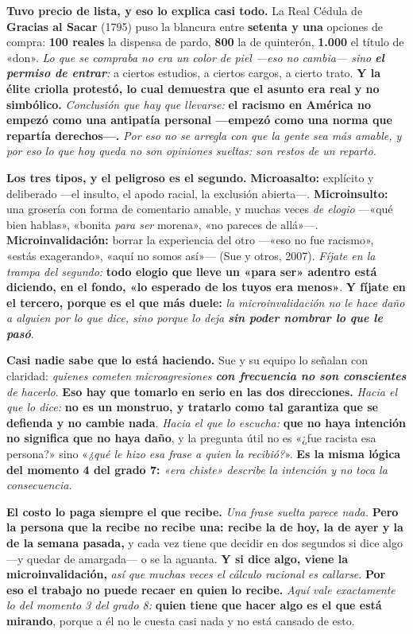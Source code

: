 \documentclass[11pt,letterpaper]{article}
\newcommand{\milcpaso}[3]{%
\Needspace{4\baselineskip}%
\begin{tcolorbox}[enhanced,colback=white,colframe=milcLinea,arc=1.5mm,boxrule=.9pt,
  left=14mm,right=4mm,top=3mm,bottom=3mm,before skip=4pt,after skip=4pt,
  fontupper=\RaggedRight,
  overlay={\node[anchor=north west,circle,fill=#2,text=white,inner sep=0pt,
    minimum size=7.4mm,font=\sffamily\bfseries\small]
    at ([xshift=3.6mm,yshift=-3.2mm]frame.north west) {#1};}]
#3
\end{tcolorbox}}
\begin{document}
\milcpaso{1}{milcTurquesa}{\textbf{Tuvo precio de lista, y eso lo explica casi todo.} La Real Cédula de \textbf{Gracias al Sacar} (1795) puso la blancura entre \textbf{setenta y una} opciones de compra: \textbf{100 reales} la dispensa de pardo, \textbf{800} la de quinterón, \textbf{1.000} el título de «don». \emph{Lo que se compraba no era un color de piel ---eso no cambia--- sino \textbf{el permiso de entrar}:} a ciertos estudios, a ciertos cargos, a cierto trato. \textbf{Y la élite criolla protestó, lo cual demuestra que el asunto era real y no simbólico.} \emph{Conclusión que hay que llevarse:} \textbf{el racismo en América no empezó como una antipatía personal ---empezó como una \textbf{norma que repartía derechos}---.} \emph{Por eso no se arregla con que la gente sea más amable, y por eso lo que hoy queda no son opiniones sueltas: son restos de un reparto.}}
\milcpaso{2}{milcTurquesa}{\textbf{Los tres tipos, y el peligroso es el segundo.} \textbf{Microasalto:} explícito y deliberado ---el insulto, el apodo racial, la exclusión abierta---. \textbf{Microinsulto:} una grosería con forma de comentario amable, y muchas veces \emph{de elogio} ---«qué bien hablas», «bonita \emph{para ser} morena», «no pareces de allá»---. \textbf{Microinvalidación:} borrar la experiencia del otro ---«eso no fue racismo», «estás exagerando», «aquí no somos así»--- (Sue y otros, 2007). \emph{Fíjate en la trampa del segundo:} \textbf{todo elogio que lleve un «para ser» adentro está diciendo, en el fondo, «lo esperado de los tuyos era menos»}. \textbf{Y fíjate en el tercero, porque es el que más duele:} \emph{la microinvalidación no le hace daño a alguien por lo que dice, sino porque lo deja \textbf{sin poder nombrar lo que le pasó}}.}
\milcpaso{3}{milcTurquesa}{\textbf{Casi nadie sabe que lo está haciendo.} Sue y su equipo lo señalan con claridad: \emph{quienes cometen microagresiones \textbf{con frecuencia no son conscientes} de hacerlo}. \textbf{Eso hay que tomarlo en serio en las dos direcciones.} \emph{Hacia el que lo dice:} \textbf{no es un monstruo, y tratarlo como tal garantiza que se defienda y no cambie nada}. \emph{Hacia el que lo escucha:} \textbf{que no haya intención no significa que no haya daño}, y la pregunta útil no es «¿fue racista esa persona?» sino «\emph{¿qué le hizo esa frase a quien la recibió?}». \textbf{Es la misma lógica del momento 4 del grado 7:} \emph{«era chiste» describe la intención y no toca la consecuencia.}}
\milcpaso{4}{milcTurquesa}{\textbf{El costo lo paga siempre el que recibe.} \emph{Una frase suelta parece nada.} \textbf{Pero la persona que la recibe no recibe una: recibe la de hoy, la de ayer y la de la semana pasada,} y cada vez tiene que decidir en dos segundos si dice algo ---y quedar de amargada--- o se la aguanta. \textbf{Y si dice algo, viene la microinvalidación,} \emph{así que muchas veces el cálculo racional es callarse}. \textbf{Por eso el trabajo no puede recaer en quien lo recibe.} \emph{Aquí vale exactamente lo del momento 3 del grado 8:} \textbf{quien tiene que hacer algo es el que está mirando}, porque a él no le cuesta casi nada y no está cansado de esto.}
\end{document}
